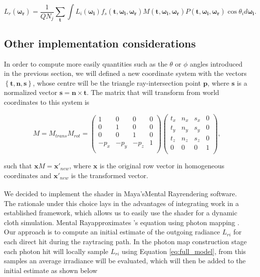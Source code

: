 \documentclass[12pt]{article}
\newcommand{\omegai}{\boldsymbol{\omega_i}}
\newcommand{\omegar}{\boldsymbol{\omega_r}}
\newcommand{\tb}{\mathbf{t}}
\begin{document}
\begin{equation}
L_{r}(\omegar) = \frac{1}{Q N_j} \sum_\tb \int L_i(\omegai) f_s(\tb, \omegai, \omegar) M(\tb, \omegai, \omegar) P(\tb, \omegai, \omegar)  \cos \theta_i d \omegai.
\end{equation}

\subsection{Other implementation considerations}

In order to compute more easily quantities such as the $\theta$ or $\phi$ angles introduced in the previous section, we will defined a new coordinate system with the vectors $\left\lbrace \tb,\mathbf{n},\mathbf{s} \right\rbrace$, whose centre will be the triangle ray-intersection point $\mathbf{p}$, where $\mathbf{s}$ is a normalized vector $\mathbf{s} = \mathbf{n} \times \tb$.
The matrix that will transform from world coordinates to this system is

\begin{equation}
M = M_{trans}M_{rot} =
\begin{pmatrix}
1 & 0 & 0 & 0 \\
0 & 1 & 0 & 0 \\
0 & 0 & 1 & 0 \\
-p_x & -p_y & -p_z & 1 \\
\end{pmatrix}
\begin{pmatrix}
t_x & n_x & s_x & 0 \\
t_y & n_y & s_y & 0 \\
t_z & n_z & s_z & 0 \\
0 & 0 & 0 & 1 \\
\end{pmatrix},
\end{equation}

such that $\mathbf{x}M=\mathbf{x}'_{new}$, where $\mathbf{x}$ is the original row vector in homogeneous coordinates and $\mathbf{x}'_{new}$ is the transformed vector.

We decided to implement the shader in Maya's\textsuperscript\textregistered Mental Ray\textsuperscript\textregistered rendering software.
The rationale under this choice lays in the advantages of integrating work in a established framework, which allows us to easily use the shader for a dynamic cloth simulation.
Mental Ray\texttrademark approximates \citeauthor{Kajiya1986}'s equation \cite{Kajiya1986} using photon mapping \cite{Jensen1996}.
Our approach is to compute an initial estimate of the outgoing radiance $L_{ri}$ for each direct hit during the raytracing path.
In the photon map construction stage each photon hit will locally sample $L_{ri}$ using Equation \ref{eq:full_model}, from this samples an average irradiance will be evaluated, which will then be added to the initial estimate as shown below
\end{document}
